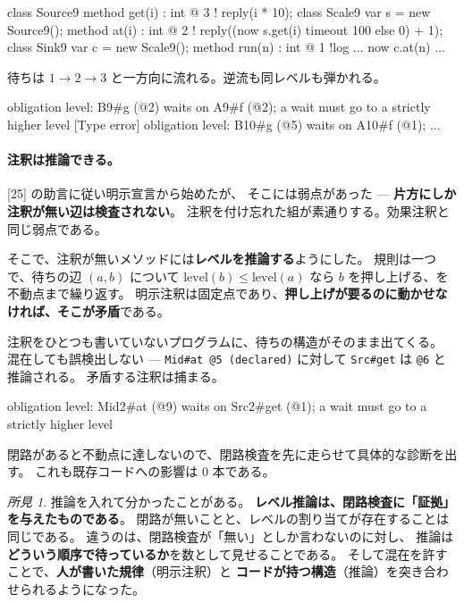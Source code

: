 \documentclass[11pt,a4paper]{ltjsarticle}
\theoremstyle{definition}
\theoremstyle{remark}
\newtheorem{finding}[theorem]{所見}
\begin{document}
\begin{aipl}
class Source9 { method get(i) : int @ 3 !{} { reply(i * 10); } }
class Scale9  {
  var s = new Source9();
  method at(i) : int @ 2 !{} { reply((now s.get(i) timeout 100 else 0) + 1); }
}
class Sink9 {
  var c = new Scale9();
  method run(n) : int @ 1 !{log} { ... now c.at(n) ... }
}
\end{aipl}

待ちは $1 \to 2 \to 3$ と一方向に流れる。逆流も同レベルも弾かれる。

\begin{term}
 obligation level: B9#g (@2) waits on A9#f (@2);
             a wait must go to a strictly higher level
[Type error] obligation level: B10#g (@5) waits on A10#f (@1); ...
\end{term}

\paragraph{注釈は推論できる。}
[25] の助言に従い明示宣言から始めたが、
そこには弱点があった --- \textbf{片方にしか注釈が無い辺は検査されない}。
注釈を付け忘れた組が素通りする。効果注釈と同じ弱点である。

そこで、注釈が無いメソッドには\textbf{レベルを推論する}ようにした。
規則は一つで、待ちの辺 $(a, b)$ について
$\mathrm{level}(b) \le \mathrm{level}(a)$ なら $b$ を押し上げる、を不動点まで繰り返す。
明示注釈は固定点であり、\textbf{押し上げが要るのに動かせなければ、そこが矛盾}である。


注釈をひとつも書いていないプログラムに、待ちの構造がそのまま出てくる。
混在しても誤検出しない --- \texttt{Mid\#at @5 (declared)} に対して
\texttt{Src\#get} は \texttt{@6} と推論される。
矛盾する注釈は捕まる。

\begin{term}
 obligation level: Mid2#at (@9) waits on Src2#get (@1);
             a wait must go to a strictly higher level
\end{term}

閉路があると不動点に達しないので、閉路検査を先に走らせて具体的な診断を出す。
これも既存コードへの影響は 0 本である。

\begin{finding}
推論を入れて分かったことがある。
\textbf{レベル推論は、閉路検査に「証拠」を与えたものである}。
閉路が無いことと、レベルの割り当てが存在することは同じである。
違うのは、閉路検査が「無い」としか言わないのに対し、
推論は\textbf{どういう順序で待っているか}を数として見せることである。
そして混在を許すことで、\textbf{人が書いた規律}（明示注釈）と
\textbf{コードが持つ構造}（推論）を突き合わせられるようになった。
\end{finding}
\end{document}
